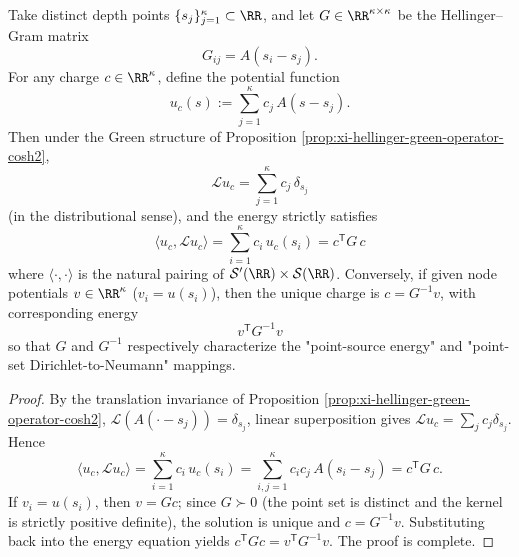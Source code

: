 \begin{proposition}\label{prop:xi-hellinger-charge-potential-duality-dtn}
Take distinct depth points \(\{s_j\}_{j=1}^\kappa\subset\RR\), and let \(G\in\RR^{\kappa\times\kappa}\) be the Hellinger--Gram matrix
\[
G_{ij}=A(s_i-s_j).
\]
For any charge \(c\in\RR^\kappa\), define the potential function
\[
u_c(s):=\sum_{j=1}^{\kappa}c_j\,A(s-s_j).
\]
Then under the Green structure of Proposition \ref{prop:xi-hellinger-green-operator-cosh2},
\[
\mathcal L u_c=\sum_{j=1}^{\kappa}c_j\,\delta_{s_j}
\]
(in the distributional sense), and the energy strictly satisfies
\[
\boxed{\;
\langle u_c,\mathcal L u_c\rangle
=\sum_{i=1}^{\kappa}c_i\,u_c(s_i)
=c^{\mathsf T}G\,c\;}
\]
where \(\langle\cdot,\cdot\rangle\) is the natural pairing of \(\mathcal S'(\RR)\times\mathcal S(\RR)\).
Conversely, if given node potentials \(v\in\RR^\kappa\) (\(v_i=u(s_i)\)), then the unique charge is \(c=G^{-1}v\), with corresponding energy
\[
\boxed{\;v^{\mathsf T}G^{-1}v\;}
\]
so that \(G\) and \(G^{-1}\) respectively characterize the "point-source energy" and "point-set Dirichlet-to-Neumann" mappings.
\end{proposition}
\begin{proof}
By the translation invariance of Proposition \ref{prop:xi-hellinger-green-operator-cosh2}, \(\mathcal L(A(\cdot-s_j))=\delta_{s_j}\), linear superposition gives \(\mathcal L u_c=\sum_j c_j\delta_{s_j}\).
Hence
\[
\langle u_c,\mathcal L u_c\rangle
=\sum_{i=1}^{\kappa}c_i\,u_c(s_i)
=\sum_{i,j=1}^{\kappa}c_i c_j\,A(s_i-s_j)
=c^{\mathsf T}G\,c.
\]
If \(v_i=u(s_i)\), then \(v=Gc\); since \(G\succ0\) (the point set is distinct and the kernel is strictly positive definite), the solution is unique and \(c=G^{-1}v\).
Substituting back into the energy equation yields \(c^{\mathsf T}G c=v^{\mathsf T}G^{-1}v\). The proof is complete.
\end{proof}

